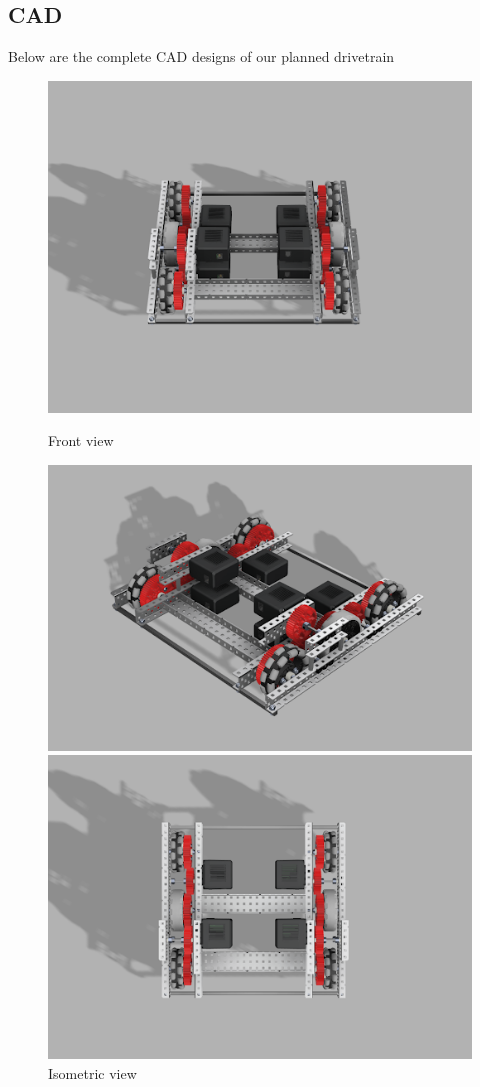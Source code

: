\subsection*{CAD}
Below are the complete CAD designs of our planned drivetrain
\begin{figure}[hbt!] %
    \begin{minipage}{.5\textwidth}
        \centering
        \includegraphics[width=.8\linewidth]{images/Frontdown-V1-Drivetrain.png}
        \caption{Front view}
        \label{fig:frontdown}
    \end{minipage}
    \begin{minipage}{.5\textwidth}
        \centering
        \includegraphics[width=.8\linewidth]{images/Iso-V1-Drivetrain.png}
        \caption{Isometric view}
        \label{fig:iso}
    \end{minipage}
    \begin{minipage}{.5\textwidth}
        \centering
        \includegraphics[width=.8\linewidth]{images/Topdown-V1-Drivetrain.png}

\end{minipage}
\end{figure}
